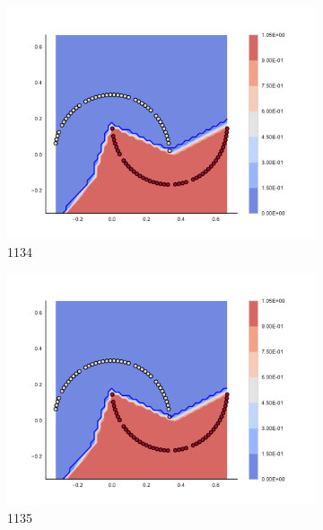 \begin{figure}[h]
\begin{subfigure}[b]{0.09\textwidth}
    \includegraphics[clip, trim=2.35cm 1.75cm 4.5cm 0cm,width=\textwidth]{img/convergence/1134.pdf}
    \caption{1134}
    \label{fig:convergence_1134}
\end{subfigure}
%
\begin{subfigure}[b]{0.09\textwidth}
    \includegraphics[clip, trim=2.35cm 1.75cm 4.5cm 0cm,width=\textwidth]{img/convergence/1135.pdf}
    \caption{1135}
    \label{fig:convergence_1135}
\end{subfigure}
%
\begin{subfigure}[b]{0.09\textwidth}

\end{subfigure}
\end{figure}
